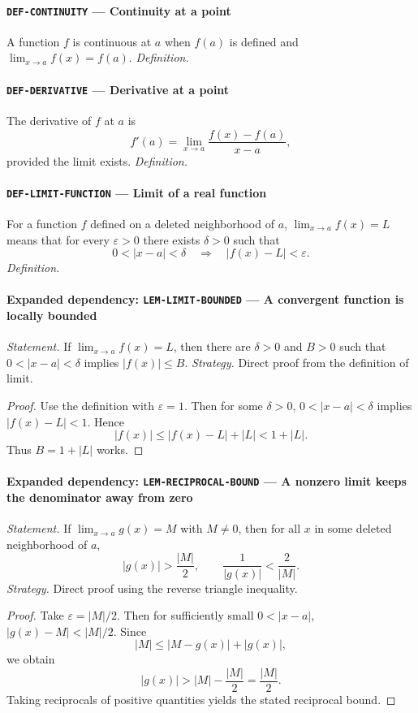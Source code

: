 \documentclass[10pt]{article}
\newcommand{\pidraw}[1]{\begingroup\urlstyle{tt}\nolinkurl{#1}\endgroup}
\theoremstyle{definition}
\theoremstyle{remark}
\begin{document}
\paragraph{\pidraw{DEF-CONTINUITY} --- Continuity at a point}
A function $f$ is continuous at $a$ when $f(a)$ is defined and $\lim_{x\to a}f(x)=f(a)$.
\textit{Definition.}

\paragraph{\pidraw{DEF-DERIVATIVE} --- Derivative at a point}
The derivative of $f$ at $a$ is
\[
f'(a)=\lim_{x\to a}\frac{f(x)-f(a)}{x-a},
\]
provided the limit exists.
\textit{Definition.}

\paragraph{\pidraw{DEF-LIMIT-FUNCTION} --- Limit of a real function}
For a function $f$ defined on a deleted neighborhood of $a$, $\lim_{x\to a}f(x)=L$ means that for every $\varepsilon>0$ there exists $\delta>0$ such that
\[
0<|x-a|<\delta\quad\Longrightarrow\quad |f(x)-L|<\varepsilon.
\]
\textit{Definition.}

\paragraph{Expanded dependency: \pidraw{LEM-LIMIT-BOUNDED} --- A convergent function is locally bounded}
\textit{Statement.} If $\lim_{x\to a}f(x)=L$, then there are $\delta>0$ and $B>0$ such that
$0<|x-a|<\delta$ implies $|f(x)|\le B$.
\textit{Strategy.} Direct proof from the definition of limit.
\begin{proof}Use the definition with $\varepsilon=1$. Then for some $\delta>0$,
$0<|x-a|<\delta$ implies $|f(x)-L|<1$. Hence
\[
|f(x)|\le |f(x)-L|+|L|<1+|L|.
\]
Thus $B=1+|L|$ works.\end{proof}

\paragraph{Expanded dependency: \pidraw{LEM-RECIPROCAL-BOUND} --- A nonzero limit keeps the denominator away from zero}
\textit{Statement.} If $\lim_{x\to a}g(x)=M$ with $M\ne0$, then for all $x$ in some deleted neighborhood of $a$,
\[
|g(x)|>\frac{|M|}{2},\qquad \frac1{|g(x)|}<\frac2{|M|}.
\]
\textit{Strategy.} Direct proof using the reverse triangle inequality.
\begin{proof}Take $\varepsilon=|M|/2$. Then for sufficiently small $0<|x-a|$,
$|g(x)-M|<|M|/2$. Since
\[
|M|\le |M-g(x)|+|g(x)|,
\]
we obtain
\[
|g(x)|>|M|-\frac{|M|}{2}=\frac{|M|}{2}.
\]
Taking reciprocals of positive quantities yields the stated reciprocal bound.\end{proof}
\end{document}
